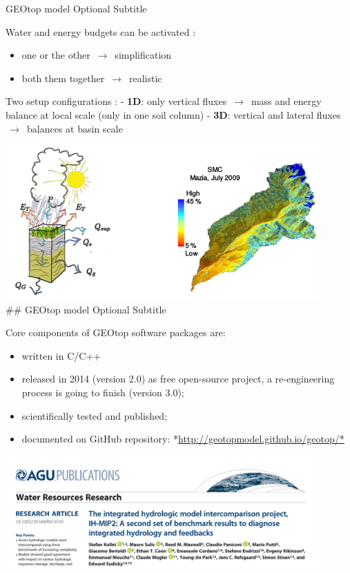 \documentclass[ignorenonframetext,]{beamer}
\providecommand{\tightlist}{%
  \setlength{\itemsep}{0pt}\setlength{\parskip}{0pt}}
\begin{document}
\begin{frame}{GEOtop model Optional Subtitle}

Water and energy budgets can be activated :

\begin{itemize}
\tightlist
\item
  one or the other \(\,\to\,\) simplification
\item
  both them together \(\,\to\,\) realistic
\end{itemize}

Two setup configurations : - \textbf{1D}: only vertical fluxes
\(\,\to\,\) mass and energy balance at local scale (only in one soil
column) - \textbf{3D}: vertical and lateral fluxes \(\,\to\,\) balances
at basin scale

\includegraphics[width=0.90000\textwidth]{resources/images/geotop_ET_SWC.png}\\
\#\# GEOtop model Optional Subtitle

Core components of GEOtop software packages are:

\begin{itemize}
\tightlist
\item
  written in C/C++
\item
  released in 2014 (version 2.0) as free open-source project, a
  re-engineering process is going to finish (version 3.0);
\item
  scientifically tested and published;
\item
  documented on GitHub repository:
  *\url{http://geotopmodel.github.io/geotop/*}
\end{itemize}

\includegraphics[width=0.90000\textwidth]{resources/images/geotop_paper_2017.png}\\

\end{frame}
\end{document}
